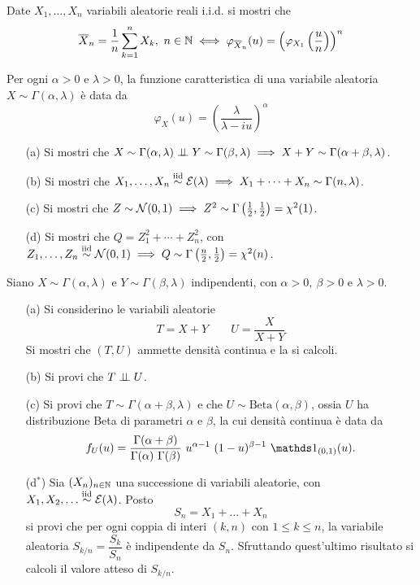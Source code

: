 \Esercizio{} %
Date $X_1,\dots,X_n$ variabili aleatorie reali i.i.d. si mostri che
\[
\overline{X}_n=\displaystyle\frac{1}{n}\sum_{k=1}^n X_k,\ n\in\mathbb{N}\iff \varphi_{\overline{X}_n}(u)=\left(\varphi_{X_1}\left(\frac{u}{n}\right)\right)^n
\]

\Esercizio{} %
Per ogni $\alpha>0$ e $\lambda>0$, la funzione caratteristica di una variabile aleatoria $X\sim\Gamma(\alpha,\lambda)$ è data da
\[
\varphi_X(u)=\left( \frac{\lambda}{\lambda-iu} \right)^\alpha
\]
\begin{enumerate}
\item [(a)] Si mostri che $X\sim\Gamma(\alpha,\lambda)\perp \!\!\! \perp Y\sim\Gamma(\beta,\lambda)\implies X+Y\sim\Gamma(\alpha+\beta,\lambda)$.
\item [(b)] Si mostri che $X_1,\dots,X_n\stackrel{\mathrm{iid}}{\sim}\mathcal{E}(\lambda)\implies X_1+\cdots+X_n\sim\Gamma(n,\lambda)$.
\item [(c)] Si mostri che $Z\sim\mathcal{N}(0,1)\implies Z^2\sim\Gamma\left(\frac{1}{2},\frac{1}{2}\right)=\chi^2(1)$.
\item [(d)] Si mostri che $Q=Z_1^2+\cdots+Z_n^2$, con $Z_1,\dots,Z_n\stackrel{\mathrm{iid}}{\sim}\mathcal{N}(0,1)\implies Q\sim\Gamma\left(\frac{n}{2},\frac{1}{2}\right)=\chi^2(n)$.
\end{enumerate}

\Esercizio{} %
Siano $X\sim\Gamma(\alpha,\lambda)$ e $Y\sim\Gamma(\beta,\lambda)$ indipendenti, con $\alpha>0,\ \beta>0$ e $\lambda>0$.
\begin{enumerate}
\item [(a)] Si considerino le variabili aleatorie
\[
T=X+Y\qquad U=\frac{X}{X+Y}
\]
Si mostri che $(T,U)$ ammette densità continua e la si calcoli.
\item [(b)] Si provi che $T\perp \!\!\! \perp U$.
\item [(c)] Si provi che $T\sim\Gamma(\alpha+\beta,\lambda)$ e che $U\sim\text{Beta}(\alpha,\beta)$, ossia $U$ ha distribuzione Beta di parametri $\alpha$ e $\beta$, la cui densità continua è data da
\[
f_U(u)=\frac{\Gamma(\alpha+\beta)}{\Gamma(\alpha)\ \Gamma(\beta)}\ u^{\alpha-1}\ (1-u)^{\beta-1}\ \Ind_{(0,1)}(u).
\]
\item [(d$^\ast$)] Sia $(X_n)_{n\in\mathbb{N}}$ una successione di variabili aleatorie, con $X_1,X_2,\dots\stackrel{\mathrm{iid}}{\sim}\mathcal{E}(\lambda)$. Posto
\[
S_n=X_1+\dots+X_n
\]
si provi che per ogni coppia di interi $(k,n)$ con $1\leq k\leq n$, la variabile aleatoria $S_{k/n}=\dfrac{S_k}{S_n}$ è indipendente da $S_n$. Sfruttando quest'ultimo risultato si calcoli il valore atteso di $S_{k/n}$.
\end{enumerate}

